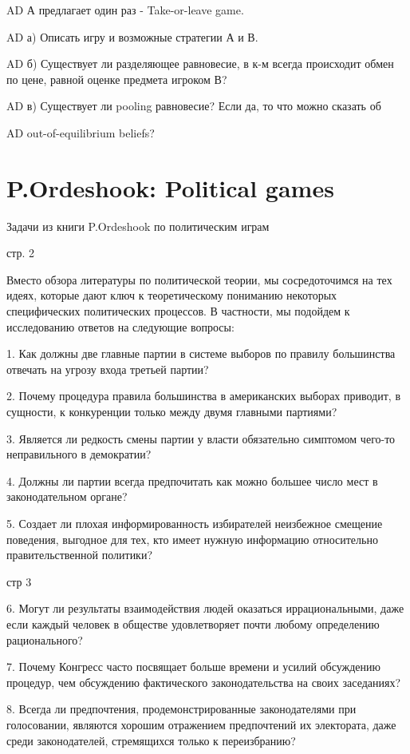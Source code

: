 \documentclass[a4paper,12pt]{article}
\begin{document}
AD А предлагает один раз - Take-or-leave game.

AD а) Описать игру и возможные стратегии А и В.

AD б) Существует ли разделяющее равновесие, в к-м всегда
происходит обмен
 по цене, равной оценке предмета игроком В?

AD в) Существует ли pooling равновесие? Если да, то что
можно сказать об

AD out-of-equilibrium beliefs?




\section{P.Ordeshook: Political games}

{\Large Задачи из книги P.Ordeshook по политическим
играм}



стр. 2

Вместо обзора литературы по политической теории, мы
сосредоточимся на тех идеях, которые дают ключ к
теоретическому пониманию некоторых специфических
политических процессов. В частности, мы подойдем к
исследованию ответов на следующие вопросы:

1. Как должны две главные партии в системе выборов
по правилу большинства отвечать на угрозу входа
третьей партии?

2. Почему процедура правила большинства в
американских выборах приводит, в сущности, к
конкуренции только между двумя главными партиями?

3. Является ли редкость смены партии у власти
обязательно симптомом чего-то неправильного в
демократии?

4. Должны ли партии всегда предпочитать как можно
большее число мест в законодательном органе?

5. Создает ли плохая информированность избирателей
неизбежное смещение поведения, выгодное для тех,
кто имеет нужную информацию относительно
правительственной политики?

стр 3

6. Могут ли результаты взаимодействия людей
оказаться иррациональными, даже если каждый человек
в обществе удовлетворяет почти любому определению
рационального?

7. Почему Конгресс часто посвящает больше времени и
усилий обсуждению процедур, чем обсуждению
фактического законодательства на своих заседаниях?

8. Всегда ли предпочтения, продемонстрированные
законодателями при голосовании, являются хорошим
отражением предпочтений их электората, даже среди
законодателей, стремящихся только к переизбранию?
\end{document}

